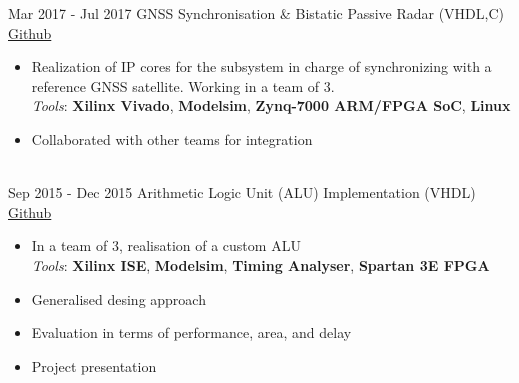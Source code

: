\documentclass[letterpaper]{twentysecondcv} %
\begin{document}
\begin{twenty}
	\twentyitem
    	{Mar 2017 -}
		{Jul 2017}
        {GNSS Synchronisation \& Bistatic Passive Radar (VHDL,C)}
        {\href{https://github.com/artic92/sistemi-embedded-task2}{Github}}
        {}
        {
            \begin{itemize}
                \item Realization of IP cores for the subsystem in charge of synchronizing with a reference GNSS satellite. Working in a team of 3. \\
                \textit{Tools}: \textbf{Xilinx Vivado}, \textbf{Modelsim}, \textbf{Zynq-7000 ARM/FPGA SoC}, \textbf{Linux}
                \item Collaborated with other teams for integration
		    \end{itemize}
        }\\
	\twentyitem
    	{Sep 2015 -}
		{Dec 2015}
        {Arithmetic Logic Unit (ALU) Implementation (VHDL)}
        {\href{https://github.com/artic92/alu_xilinx}{Github}}
        {}
        {
            \begin{itemize}
                \item In a team of 3, realisation of a custom ALU\\
                \textit{Tools}: \textbf{Xilinx ISE}, \textbf{Modelsim}, \textbf{Timing Analyser}, \textbf{Spartan 3E FPGA}
                \item Generalised desing approach
                \item Evaluation in terms of performance, area, and delay
                \item Project presentation

\end{itemize}}
\end{twenty}
\end{document}
